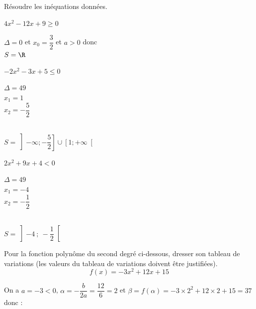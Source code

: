 \documentclass[12pt,a4paper]{article}  %
\begin{document}
Résoudre les inéquations données.
\begin{enumMet}
    \item $4x^2-12x+9\geqslant0$
    \begin{corrBox}
    	$\Delta=0$ et $x_0=\dfrac{3}{2}$ et $a>0$ donc\\ $S=\R$
    \end{corrBox}
    \item $-2x^{2}-3x+5 \leqslant 0$
    \begin{corrBox}
    	$\Delta=49$\\
    	$x_1=1$\\
    	$x_2=-\dfrac{5}{2}$\\
    	\\
    	$S=\left]-\infty;-\dfrac{5}{2}\right]\cup\left[1; +\infty\right[$
    \end{corrBox}
    \item $2x^{2}+9 x+4 < 0$
    \begin{corrBox}
    	$\Delta=49$\\
    	$x_1=-4$\\
    	$x_2=-\dfrac{1}{2}$\\
    	\\
    	$S=\left]-4\ ;\ -\dfrac{1}{2}\right[$
    \end{corrBox}
\end{enumMet}

\vspace{-0.3cm}
Pour la fonction polynôme du second degré ci-dessous, dresser son tableau de variations (les valeurs du tableau de variations doivent être justifiées).
$$f(x)=-3x^2+12x+15$$

\begin{corrBox}
	On a $a=-3<0$, $\alpha=-\dfrac{b}{2a}=\dfrac{12}{6}=2$ et $\beta=f(\alpha)=-3\times 2^2+12\times 2+15=37$ donc :\\
	\ \\
\end{corrBox}
\end{document}
